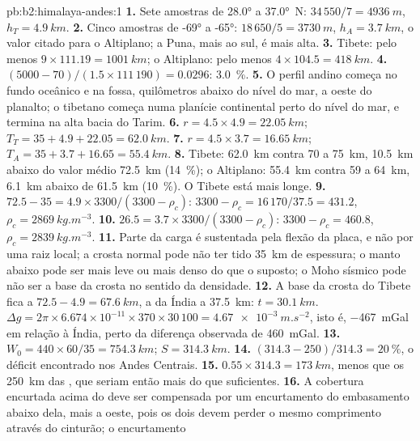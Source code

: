 \begin{solution}{pb:b2:himalaya-andes:1}
\textbf{1.} Sete amostras de \ang{28.0} a \ang{37.0}~N: $34\,550/7 = \qty{4936}{m}$, $h_T
= \qty{4.9}{km}$.
\textbf{2.} Cinco amostras de \ang{-69} a \ang{-65}: $18\,650/5 = \qty{3730}{m}$, $h_A =
\qty{3.7}{km}$, o valor citado para o Altiplano; a Puna, mais ao sul, é mais alta.
\textbf{3.} Tibete: pelo menos $9\times111.19 = \qty{1001}{km}$; o Altiplano: pelo menos $4\times
104.5 = \qty{418}{km}$.
\textbf{4.} $(5000 - 70)/(1.5\times111\,190) = 0.0296$: \qty{3.0}{\percent}.
\textbf{5.} O perfil andino começa no fundo oceânico e na fossa, quilômetros abaixo do
nível do mar, a oeste do planalto; o tibetano começa numa planície continental perto do nível do mar,
e termina na alta bacia do Tarim.
\textbf{6.} $r = 4.5\times4.9 = \qty{22.05}{km}$; $T_T = 35 + 4.9 + 22.05 = \qty{62.0}{km}$.
\textbf{7.} $r = 4.5\times3.7 = \qty{16.65}{km}$; $T_A = 35 + 3.7 + 16.65 = \qty{55.4}{km}$.
\textbf{8.} Tibete: \qty{62.0}{km} contra 70 a \qty{75}{km}, \qty{10.5}{km} abaixo do valor
médio \qty{72.5}{km} (\qty{14}{\percent}); o Altiplano: \qty{55.4}{km} contra 59 a
\qty{64}{km}, \qty{6.1}{km} abaixo de \qty{61.5}{km} (\qty{10}{\percent}). O Tibete está mais longe.
\textbf{9.} $72.5 - 35 = 4.9\times3300/(3300 - \rho_c)$: $3300 - \rho_c = 16\,170/37.5 =
431.2$, $\rho_c = \qty{2869}{kg.m^{-3}}$.
\textbf{10.} $26.5 = 3.7\times3300/(3300 - \rho_c)$: $3300 - \rho_c = 460.8$, $\rho_c =
\qty{2839}{kg.m^{-3}}$.
\textbf{11.} Parte da carga é sustentada pela flexão da placa, e não por uma raiz local; a
crosta normal pode não ter tido \qty{35}{km} de espessura; o manto abaixo pode ser mais leve ou mais denso
do que o suposto; o Moho sísmico pode não ser a base da crosta no sentido da densidade.
\textbf{12.} A base da crosta do Tibete fica a $72.5 - 4.9 = \qty{67.6}{km}$, a da Índia a
\qty{37.5}{km}: $t = \qty{30.1}{km}$. $\Delta g = 2\pi\times6.674\times10^{-11}\times370\times
30\,100 = \qty{4.67e-3}{m.s^{-2}}$, isto é, \qty{-467}{mGal} em relação à Índia, perto da
diferença observada de \qty{460}{mGal}.
\textbf{13.} $W_0 = 440\times60/35 = \qty{754.3}{km}$; $S = \qty{314.3}{km}$.
\textbf{14.} $(314.3 - 250)/314.3 = \qty{20}{\percent}$, o déficit encontrado nos Andes
Centrais.
\textbf{15.} $0.55\times314.3 = \qty{173}{km}$, menos que os \qty{250}{km} das , que seriam então mais do que suficientes.
\textbf{16.} A cobertura encurtada acima do  deve ser compensada por um encurtamento do
embasamento abaixo dela, mais a oeste, pois os dois devem perder o mesmo comprimento através do cinturão; o encurtamento

\end{solution}

